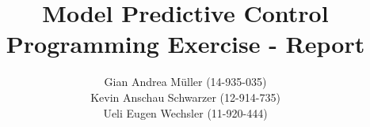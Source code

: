 \documentclass[11pt]{article}
\begin{document}
 
 
 
\title{Model Predictive Control\\
    Programming Exercise - Report} %
\author{Gian Andrea M{\"u}ller (14-935-035)\\
    Kevin Anschau Schwarzer (12-914-735)\\
    Ueli Eugen Wechsler (11-920-444)} %

\maketitle
\end{document}
